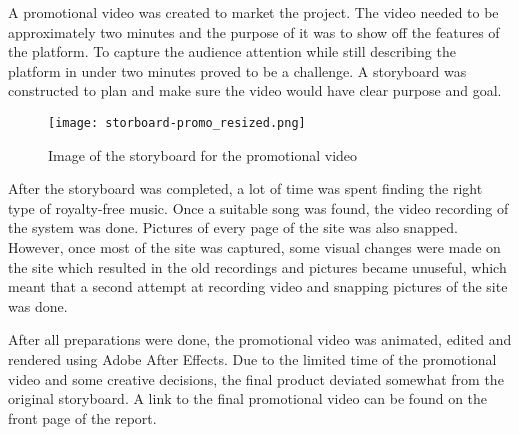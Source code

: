 A promotional video was created to market the project. The video needed to be approximately two minutes and the purpose of it was to show off the features of the platform.
To capture the audience attention while still describing the platform in under two minutes proved to be a challenge. A storyboard was constructed to plan and make sure the video would have clear purpose and goal.
\begin{figure}[h]
    \centering
    \texttt{[image: storboard-promo\_resized.png]}
    \caption{Image of the storyboard for the promotional video}
\end{figure}
After the storyboard was completed, a lot of time was spent finding the right type of royalty-free music. Once a suitable song was found, the video recording of the system was done. Pictures of every page of the site was also snapped. However, once most of the site was captured, some visual changes were made on the site which resulted in the old recordings and pictures became unuseful, which meant that a second attempt at recording video and snapping pictures of the site was done.

After all preparations were done, the promotional video was animated, edited and rendered using Adobe After Effects. Due to the limited time of the promotional video and some creative decisions, the final product deviated somewhat from the original storyboard. A link to the final promotional video can be found on the front page of the report.